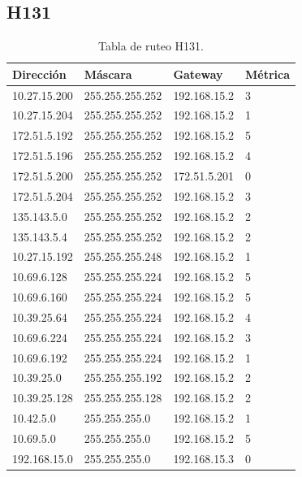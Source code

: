\documentclass[12pt,titlepage]{article}
\begin{document}
\subsection{H131}
\begin{table}
  \begin{center}
    \begin{tabular}{|l|l|l|l|}
      \hline
        \bf{Direcci\'on} & \bf{M\'ascara} & \bf{Gateway} & \bf{M\'etrica} \\
      \hline 
	10.27.15.200  & 255.255.255.252 & 192.168.15.2 & 3 \\
        10.27.15.204  & 255.255.255.252 & 192.168.15.2 & 1 \\
        172.51.5.192  & 255.255.255.252 & 192.168.15.2 & 5 \\
        172.51.5.196  & 255.255.255.252 & 192.168.15.2 & 4 \\
        172.51.5.200  & 255.255.255.252 & 172.51.5.201 & 0 \\
        172.51.5.204  & 255.255.255.252 & 192.168.15.2 & 3 \\
        135.143.5.0   & 255.255.255.252 & 192.168.15.2 & 2 \\
        135.143.5.4   & 255.255.255.252 & 192.168.15.2 & 2 \\ 	
	10.27.15.192  & 255.255.255.248 & 192.168.15.2 & 1 \\
	10.69.6.128   & 255.255.255.224 & 192.168.15.2 & 5 \\
        10.69.6.160   & 255.255.255.224 & 192.168.15.2 & 5 \\
	10.39.25.64   & 255.255.255.224 & 192.168.15.2 & 4 \\       
	10.69.6.224   & 255.255.255.224 & 192.168.15.2 & 3 \\
	10.69.6.192   & 255.255.255.224 & 192.168.15.2 & 1 \\	
	10.39.25.0    & 255.255.255.192 & 192.168.15.2 & 2 \\
	10.39.25.128  & 255.255.255.128 & 192.168.15.2 & 2 \\
	10.42.5.0     & 255.255.255.0 & 192.168.15.2 & 1 \\
        10.69.5.0     & 255.255.255.0 & 192.168.15.2 & 5 \\
        192.168.15.0  & 255.255.255.0 & 192.168.15.3 & 0 \\  
    \hline
    \end{tabular} \\
  \end{center}
  \caption{Tabla de ruteo H131.}
\end{table}
\FloatBarrier
\end{document}
